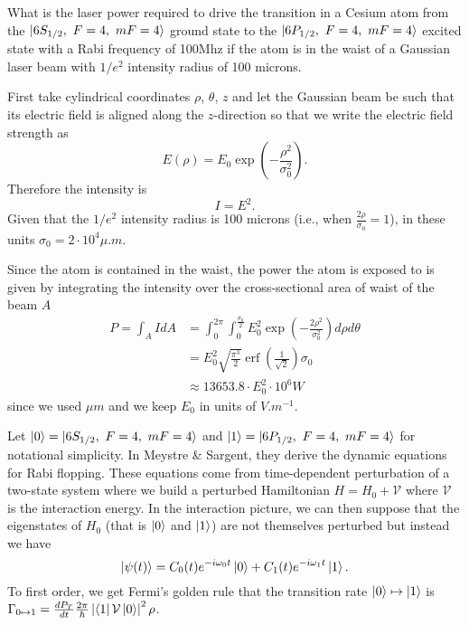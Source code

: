 \documentclass[12pt]{article} %
\begin{document}
\begin{problem}
What is the laser power required to drive the transition in a Cesium atom from the $\ket{6S_{1/2},~F=4,~mF=4}$ ground state to the $\ket{6P_{1/2}, ~F=4, ~mF=4}$ excited state with a Rabi frequency of 100Mhz if the atom is in the waist of a Gaussian laser beam with $1/e^2$ intensity radius of 100 microns.
\end{problem}
\begin{solution}
First take cylindrical coordinates $\rho$, $\theta$, $z$ and let the Gaussian beam be such that its electric field is aligned along the $z$-direction so that we write the electric field strength as
\begin{equation}
E(\rho) = E_0 \exp \left( -\frac{\rho^2}{\sigma_0^2}\right).
\end{equation}
Therefore the intensity is
\begin{equation}
I=E^2.
\end{equation}
Given that the $1/e^2$ intensity radius is 100 microns (i.e., when $\frac{2\rho}{\sigma_0}=1$), in these units $\sigma_0=2\cdot 10^4 \si{\mu.m}$. 

Since the atom is contained in the waist, the power the atom is exposed to is given by integrating the intensity over the cross-sectional area of waist of the beam $A$
\begin{align}
P = \int_{A} I dA &= \int_{0}^{2\pi} \int_{0}^{\frac{\sigma_0}{2}} E_0^2 \exp\left( -\frac{2\rho^2}{\sigma_0^2}\right) d\rho d \theta \\
&= E_0^2 \sqrt{\frac{\pi^3}{2}} \operatorname{erf}\left(\frac{1}{\sqrt{2}} \right) \sigma_0 \\
&\approx 13653.8 \cdot E_0^2 \cdot 10^{6} \si{W}
\end{align}
since we used $\si{\mu m}$ and we keep $E_0$ in units of $\si{V.m^{-1}}$.

Let $\ket{0}=\ket{6S_{1/2},~F=4,~mF=4}$ and $\ket{1}=\ket{6P_{1/2}, ~F=4, ~mF=4}$ for notational simplicity. In Meystre \& Sargent, they derive the dynamic equations for Rabi flopping. These equations come from time-dependent perturbation of a two-state system where we build a perturbed Hamiltonian $H = H_0 + \mathcal{V}$ where $\mathcal{V}$ is the interaction energy. In the interaction picture, we can then suppose that the eigenstates of $H_0$ (that is $\ket{0}$ and $\ket{1}$) are not themselves perturbed but instead we have
\begin{equation}
\ket{\psi(t)} = C_0(t) e^{-i\omega_0 t} \ket{0} + C_1(t) e^{-i\omega_1 t} \ket{1}.
\end{equation}
To first order, we get Fermi's golden rule that the transition rate $\ket{0}\mapsto \ket{1}$ is $\Gamma_{0\mapsto 1} = \frac{dP_T}{dt} \frac{2\pi}{\hbar}\left| \bra{1}\mathcal{V}\ket{0}\right|^2 \rho$. 


\end{solution}
\end{document}
